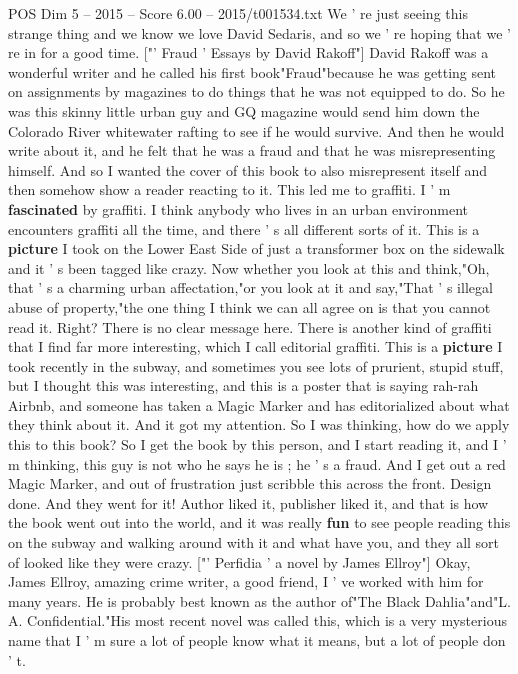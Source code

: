 \begin{textsample}{POS Dim 5 – 2015 – Score 6.00 – 2015/t001534.txt}
We ' re just seeing this strange thing and we know we love David Sedaris, and so we ' re hoping that we ' re in for a good time. ["' Fraud ' Essays by David Rakoff"] David Rakoff was a wonderful writer and he called his first book"Fraud"because he was getting sent on assignments by magazines to do things that he was not equipped to do.
So he was this skinny little urban guy and GQ magazine would send him down the Colorado River whitewater rafting to see if he would survive.
And then he would write about it, and he felt that he was a fraud and that he was misrepresenting himself.
And so I wanted the cover of this book to also misrepresent itself and then somehow show a reader reacting to it.
This led me to graffiti.
I ' m \textbf{fascinated} by graffiti.
I think anybody who lives in an urban environment encounters graffiti all the time, and there ' s all different sorts of it.
This is a \textbf{picture} I took on the Lower East Side of just a transformer box on the sidewalk and it ' s been tagged like crazy.
Now whether you look at this and think,"Oh, that ' s a charming urban affectation,"or you look at it and say,"That ' s illegal abuse of property,"the one thing I think we can all agree on is that you cannot read it.
Right?
There is no clear message here.
There is another kind of graffiti that I find far more interesting, which I call editorial graffiti.
This is a \textbf{picture} I took recently in the subway, and sometimes you see lots of prurient, stupid stuff, but I thought this was interesting, and this is a poster that is saying rah-rah Airbnb, and someone has taken a Magic Marker and has editorialized about what they think about it.
And it got my attention.
So I was thinking, how do we apply this to this book?
So I get the book by this person, and I start reading it, and I ' m thinking, this guy is not who he says he is ; he ' s a fraud.
And I get out a red Magic Marker, and out of frustration just scribble this across the front.
Design done.
And they went for it!
Author liked it, publisher liked it, and that is how the book went out into the world, and it was really \textbf{fun} to see people reading this on the subway and walking around with it and what have you, and they all sort of looked like they were crazy. ["' Perfidia ' a novel by James Ellroy"] Okay, James Ellroy, amazing crime writer, a good friend, I ' ve worked with him for many years.
He is probably best known as the author of"The Black Dahlia"and"L.
A.
Confidential."His most recent novel was called this, which is a very mysterious name that I ' m sure a lot of people know what it means, but a lot of people don ' t.

\end{textsample}

